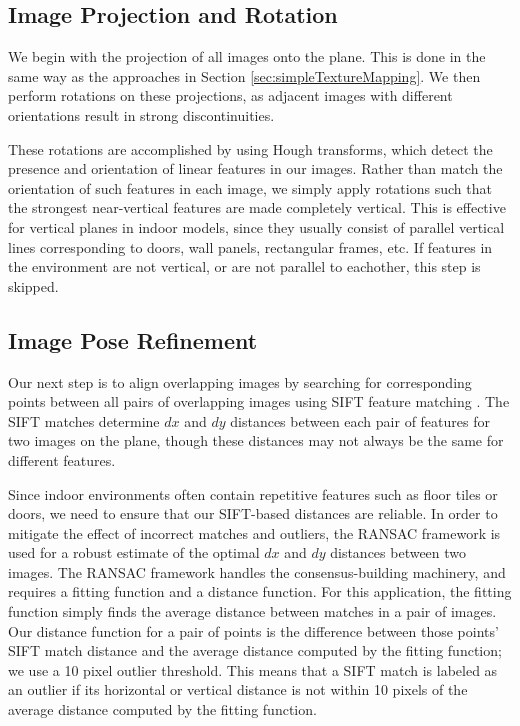 \documentclass[10pt,twocolumn,letterpaper]{article}
\begin{document}
\subsection{Image Projection and Rotation}
\label{sec:projectionAndRotation}
We begin with the projection of all images onto the plane. This is
done in the same way as the approaches in Section
\ref{sec:simpleTextureMapping}. We then perform rotations on these
projections, as adjacent images with different orientations result in
strong discontinuities.

These rotations are accomplished by using Hough transforms, which
detect the presence and orientation of linear features in our
images. Rather than match the orientation of such features in each
image, we simply apply rotations such that the strongest near-vertical
features are made completely vertical. This is effective for vertical
planes in indoor models, since they usually consist of parallel
vertical lines corresponding to doors, wall panels, rectangular
frames, etc. If features in the environment are not vertical, or are
not parallel to eachother, this step is skipped.


\subsection{Image Pose Refinement}
\label{sec:robustSIFTFeatureMatching}
Our next step is to align overlapping images by searching for
corresponding points between all pairs of overlapping images using
SIFT feature matching \cite{lowe1999object}. The SIFT matches
determine $dx$ and $dy$ distances between each pair of features for
two images on the plane, though these distances may not always be the
same for different features.

Since indoor environments often contain repetitive features such as
floor tiles or doors, we need to ensure that our SIFT-based distances
are reliable. In order to mitigate the effect of incorrect matches and
outliers, the RANSAC framework \cite{fischler1981random} is used for a
robust estimate of the optimal $dx$ and $dy$ distances between two
images. The RANSAC framework handles the consensus-building machinery,
and requires a fitting function and a distance function. For this
application, the fitting function simply finds the average distance
between matches in a pair of images. Our distance function for a pair
of points is the difference between those points' SIFT match distance
and the average distance computed by the fitting function; we use a 10
pixel outlier threshold. This means that a SIFT match is labeled as an
outlier if its horizontal or vertical distance is not within 10 pixels
of the average distance computed by the fitting function.
\end{document}

